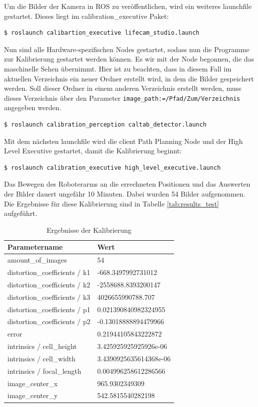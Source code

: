 Um die Bilder der Kamera in ROS zu veröffentlichen, wird ein weiteres launchfile gestartet. Dieses liegt im calibration\_executive Paket:
\begin{lstlisting}[language=bash]
  $ roslaunch calibartion_executive lifecam_studio.launch
\end{lstlisting}

Nun sind alle Hardware-spezifischen Nodes gestartet, sodass nun die Programme zur Kalibrierung gestartet werden können. Es wir mit der Node begonnen, die das maschinelle Sehen übernimmt. Hier ist zu beachten, dass in diesem Fall im aktuellen Verzeichnis ein neuer Ordner erstellt wird, in dem die Bilder gespeichert werden. Soll dieser Ordner in einem anderen Verzeichnis erstellt werden, muss dieses Verzeichnis über den Parameter \texttt{image\_path:=/Pfad/Zum/Verzeichnis} angegeben werden.
\begin{lstlisting}[language=bash]
  $ roslaunch calibration_perception caltab_detector.launch
\end{lstlisting}

Mit dem nächsten launchfile wird die client Path Planning Node und der High Level Executive gestartet, damit die Kalibrierung beginnt:
\begin{lstlisting}[language=bash]
  $ roslaunch calibration_executive high_level_executive.launch
\end{lstlisting}

Das Bewegen des Roboterarms an die errechneten Positionen und das Auswerten der Bilder dauert ungefähr 10 Minuten. Dabei wurden 54 Bilder aufgenommen. Die Ergebnisse für diese Kalibrierung sind in Tabelle \autoref{tab:results_test} aufgeführt.
\begin{table}
\begin{tabularx}{\textwidth}{|l|X|}
	\hline
	Parametername & Wert \\\hline
	amount\_of\_images & 54\\\hline
	distortion\_coefficients / k1 & -668.3497992731012 \\\hline
	distortion\_coefficients / k2 & -2558688.8393200147 \\\hline
	distortion\_coefficients / k3 & 4026655990788.707 \\\hline
	distortion\_coefficients / p1& 0.021390840982324955 \\\hline
	distortion\_coefficients / p2 & -0.13018888894479966 \\\hline
	error & 0.21944105843222872 \\\hline
	intrinsics / cell\_height & 3.425925925925926e-06 \\\hline
	intrinsics / cell\_width & 3.4390925635614368e-06 \\\hline
	intrinsics / focal\_length & 0.004996258612286566 \\\hline
	image\_center\_x & 965.9302349309 \\\hline
	image\_center\_y & 542.5815540282198 \\\hline
\end{tabularx}
\caption{Ergebnisse der Kalibrierung}
\label{tab:results_test}
\end{table}

